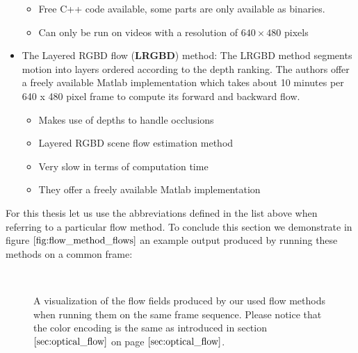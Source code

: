 \begin{itemize}
\begin{itemize}
	\item Free C++ code available, some parts are only available as binaries.
	\item Can only be run on videos with a resolution of $640 \times 480$ pixels
	\end{itemize}	
\item The Layered RGBD flow (\textbf{LRGBD}) method: The LRGBD method segments motion into layers ordered according to the depth ranking. The authors offer a freely available Matlab implementation which takes about 10 minutes per 640 x 480 pixel frame to compute its forward and backward flow.
	\begin{itemize}
	\item Makes use of depths to handle occlusions
	\item Layered RGBD scene flow estimation method
	\item Very slow in terms of computation time
	\item They offer a freely available Matlab implementation
	\end{itemize}
\end{itemize}
For this thesis let us use the abbreviations defined in the list above when referring to a particular flow method. To conclude this section we demonstrate in figure $\ref{fig:flow_method_flows}$ an example output produced by running these methods on a common frame:
\begin{figure}[H]
\begin{center}
~
\end{center}
\caption[Flow Method Flows]{A visualization of the flow fields produced by our used flow methods when running them on the same frame sequence. Please notice that the color encoding is the same as introduced in section $\ref{sec:optical_flow}$ on page $\pageref{sec:optical_flow}$.}
\label{fig:flow_method_flows}
\end{figure}

